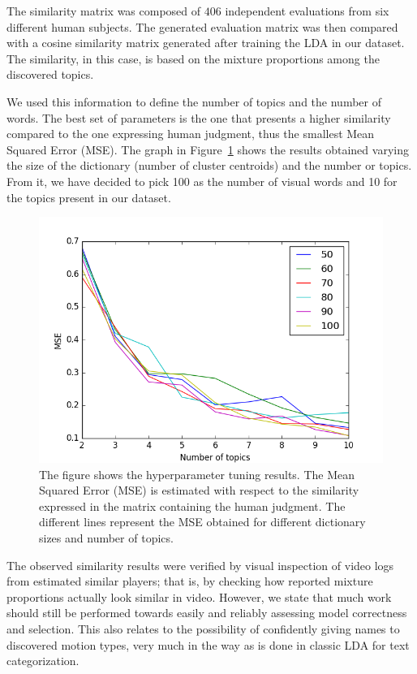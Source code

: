 {The similarity matrix was composed of $406$ independent evaluations from six different human subjects. The generated evaluation matrix was then compared with a cosine similarity matrix generated after training the LDA in our dataset. The similarity, in this case, is based on the mixture proportions among the discovered topics. 

We used this information to define the number of topics and the number of words. The best set of parameters is the one that presents a higher similarity compared to the one expressing human judgment, thus the smallest Mean Squared Error (MSE). The graph in Figure~\ref{hyperparameter_results} shows the results obtained varying the size of the dictionary (number of cluster centroids) and the number or topics. From it, we have decided to pick 100 as the number of visual words and 10 for the topics present in our dataset.

\begin{figure}[H]
	\centering
	\includegraphics[scale=0.6]{images/05-modeling/mse_dictsize-50_100_10.png}
	\caption{The figure shows the hyperparameter tuning results. The Mean Squared Error (MSE) is estimated with respect to the similarity expressed in the matrix containing the human judgment. The different lines represent the MSE obtained for different dictionary sizes and number of topics.}
  \label{hyperparameter_results}
\end{figure}

The observed similarity results were verified by visual inspection of video logs from estimated similar players; that is, by checking how reported mixture proportions actually look similar in video. However, we state that much work should still be performed towards easily and reliably assessing model correctness and selection. This also relates to the possibility of confidently giving names to discovered motion types, very much in the way as is done in classic LDA for text categorization.

}
